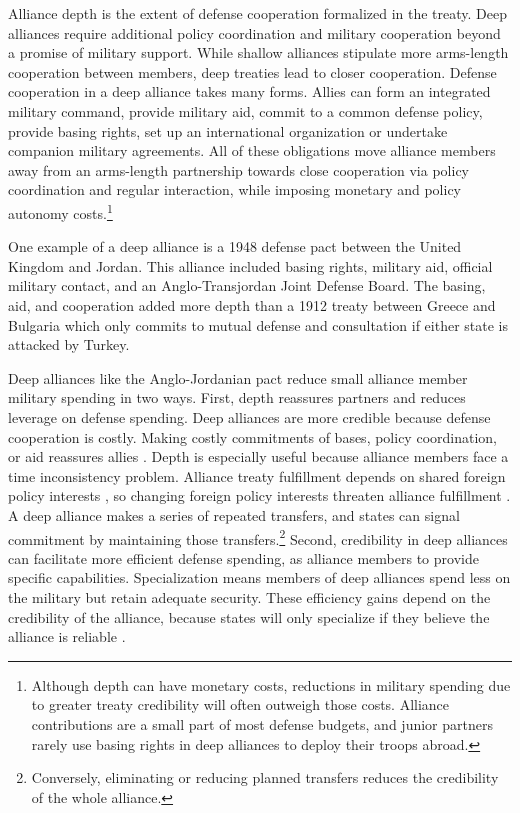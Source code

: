 \documentclass[12pt]{article}
\begin{document}
Alliance depth is the extent of defense cooperation formalized in the treaty. 
Deep alliances require additional policy coordination and military cooperation beyond a promise of military support. 
While shallow alliances stipulate more arms-length cooperation between members, deep treaties lead to closer cooperation. 
Defense cooperation in a deep alliance takes many forms. 
Allies can form an integrated military command, provide military aid, commit to a common defense policy, provide basing rights, set up an international organization or undertake companion military agreements. 
All of these obligations move alliance members away from an arms-length partnership towards close cooperation via policy coordination and regular interaction, while imposing monetary and policy autonomy costs.\footnote{Although depth can have monetary costs, reductions in military spending due to greater treaty credibility will often outweigh those costs. Alliance contributions are a small part of most defense budgets, and junior partners rarely use basing rights in deep alliances to deploy their troops abroad.} 

 
One example of a deep alliance is a 1948 defense pact between the United Kingdom and Jordan.
This alliance included basing rights, military aid, official military contact, and an Anglo-Transjordan Joint Defense Board.  
The basing, aid, and cooperation added more depth than a 1912 treaty between Greece and Bulgaria which only commits to mutual defense and consultation if either state is attacked by Turkey. 


Deep alliances like the Anglo-Jordanian pact reduce small alliance member military spending in two ways. 
First, depth reassures partners and reduces leverage on defense spending.  
Deep alliances are more credible because defense cooperation is costly. 
Making costly commitments of bases, policy coordination, or aid reassures allies \citep{Morrow1994}. 
Depth is especially useful because alliance members face a time inconsistency problem. 
Alliance treaty fulfillment depends on shared foreign policy interests \citep{Morrow2000, Leeds2003a}, so changing foreign policy interests threaten alliance fulfillment \citep{LeedsSavun2007}. 
A deep alliance makes a series of repeated transfers, and states can signal commitment by maintaining those transfers.\footnote{Conversely, eliminating or reducing planned transfers reduces the credibility of the whole alliance.} 
Second, credibility in deep alliances can facilitate more efficient defense spending, as alliance members to provide specific capabilities. 
Specialization means members of deep alliances spend less on the military but retain adequate security.
These efficiency gains depend on the credibility of the alliance, because states will only specialize if they believe the alliance is reliable \citep{Leeds2003a}.  
\end{document}
